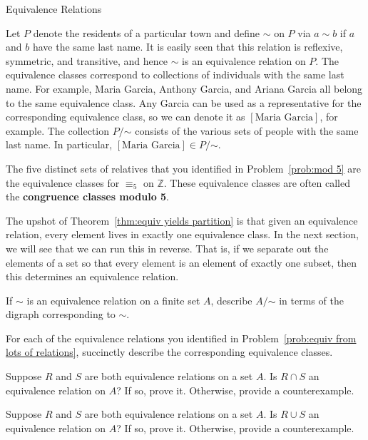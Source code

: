 \begin{section}{Equivalence Relations}
\begin{example}\label{ex:last name}
Let $P$ denote the residents of a particular town and define $\sim$ on $P$ via $a\sim b$ if $a$ and $b$ have the same last name. It is easily seen that this relation is reflexive, symmetric, and transitive, and hence $\sim$ is an equivalence relation on $P$.  The equivalence classes correspond to collections of individuals with the same last name.  For example, Maria Garcia, Anthony Garcia, and Ariana Garcia all belong to the same equivalence class.  Any Garcia can be used as a representative for the corresponding equivalence class, so we can denote it as $[\text{Maria Garcia}]$, for example. The collection $P/\mathord\sim$ consists of the various sets of people with the same last name.  In particular, $[\text{Maria Garcia}]\in P/\mathord\sim$.
\end{example}

\begin{example}
The five distinct sets of relatives that you identified in Problem~\ref{prob:mod 5} are the equivalence classes for $\equiv_5$ on $\mathbb{Z}$. These equivalence classes are often called the \textbf{congruence classes modulo 5}.
\end{example}

The upshot of Theorem~\ref{thm:equiv yields partition} is that given an equivalence relation, every element lives in exactly one equivalence class.  In the next section, we will see that we can run this in reverse.  That is, if we separate out the elements of a set so that every element is an element of exactly one subset, then this determines an equivalence relation.

\begin{problem}
If $\sim$ is an equivalence relation on a finite set $A$, describe $A/\mathord\sim$ in terms of the digraph corresponding to $\sim$.
\end{problem}

\begin{problem}
For each of the equivalence relations you identified in Problem~\ref{prob:equiv from lots of relations}, succinctly describe the corresponding equivalence classes.
\end{problem}

\begin{problem}
Suppose $R$ and $S$ are both equivalence relations on a set $A$. Is $R\cap S$ an equivalence relation on $A$? If so, prove it.  Otherwise, provide a counterexample.
\end{problem}

\begin{problem}
Suppose $R$ and $S$ are both equivalence relations on a set $A$. Is $R\cup S$ an equivalence relation on $A$? If so, prove it.  Otherwise, provide a counterexample.
\end{problem}

\end{section}